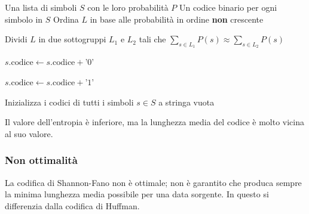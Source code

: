 \begin{algorithm}
\caption{Costruzione Codice Shannon-Fano}
\begin{algorithmic}[1]
\Require Una lista di simboli $S$ con le loro probabilità $P$
\Ensure Un codice binario per ogni simbolo in $S$
\Statex
     
        \State Ordina $L$ in base alle probabilità in ordine \textbf{non} crescente 
        
        \State Dividi $L$ in due sottogruppi $L_1$ e $L_2$ 
        \Statex \hspace{\algorithmicindent} tali che $\sum_{s \in L_1} P(s) \approx \sum_{s \in L_2} P(s)$ 
        
            \State $s\text{.codice} \leftarrow s\text{.codice} + \text{'0'}$ 
        \EndFor
        
            \State $s\text{.codice} \leftarrow s\text{.codice} + \text{'1'}$ 
        \EndFor
        
        \State {} 
        \State {} 
        
    \EndIf
    \State \Return {}
\EndFunction
\Statex
\State Inizializza i codici di tutti i simboli $s \in S$ a stringa vuota
\State {} 
\end{algorithmic}
\end{algorithm}







Il valore dell'entropia è inferiore, ma la lunghezza media del codice è molto vicina al suo valore.

\subsubsection{Non ottimalità}
La codifica di Shannon-Fano non è ottimale; non è garantito che produca sempre la minima lunghezza media possibile per una data sorgente. In questo si differenzia dalla codifica di Huffman.

